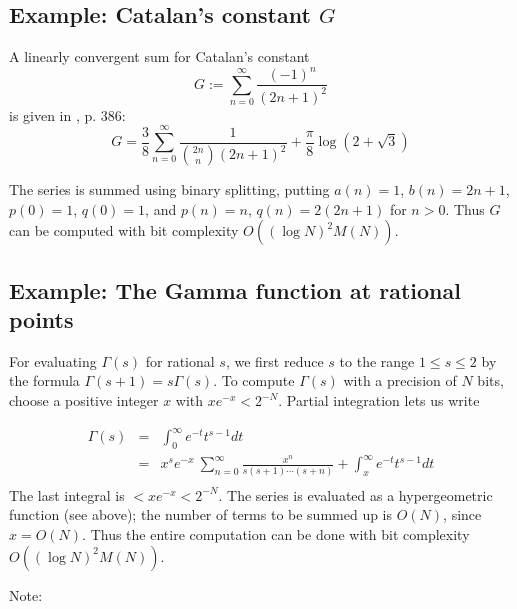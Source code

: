 
\subsection{Example: Catalan's constant \( G \)}

A linearly convergent sum for Catalan's constant 
\[
G:=\sum ^{\infty }_{n=0}\frac{(-1)^{n}}{(2n+1)^{2}}\]
is given in \cite{87}, p. 386:
\[
G = \frac{3}{8}\sum ^{\infty }_{n=0}\frac{1}{{2n \choose n} (2n+1)^{2}}
    +\frac{\pi }{8}\log (2+\sqrt{3})
\]

The series is summed using binary splitting, putting \( a(n)=1 \),  
\( b(n)=2n+1 \),  \( p(0)=1 \),  \( q(0)=1 \), and
\( p(n)=n \),  \( q(n)=2(2n+1) \) for  \( n>0 \). Thus  
\( G \) can be computed with bit complexity  \( O((\log N)^{2}M(N)) \).

\subsection{Example: The Gamma function at rational points}

For evaluating  \( \Gamma (s) \) for rational  \( s \), we first reduce \( s \)
to the range \( 1\leq s\leq 2 \) by the formula \( \Gamma (s+1)=s\Gamma (s) \).
To compute  \( \Gamma (s) \) with a precision of  \( N \) bits, choose a
positive integer  \( x \) with  \( xe^{-x}<2^{-N} \). Partial integration lets
us write 

\begin{eqnarray*}
\Gamma (s)&=& \int ^{\infty }_{0}e^{-t}t^{s-1}dt\\
          &=& x^{s}e^{-x}\:\sum ^{\infty }_{n=0}
             \frac{x^{n}}{s(s+1)\cdots (s+n)}
             +\int^{\infty }_{x}e^{-t}t^{s-1}dt\\
\end{eqnarray*}
The last integral is  \( <xe^{-x}<2^{-N} \). The series is evaluated as a
hypergeometric function (see above); the number of terms to be summed up is
\( O(N) \), since \( x=O(N) \). Thus the entire computation can be done with
bit complexity  \( O((\log N)^{2}M(N)) \).

\begin{description}
\item [Note:]~
\end{description}


